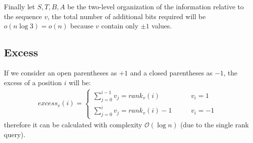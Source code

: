 \documentclass{article}
\begin{document}
Finally let $S,T,B,A$ be the two-level organization of the information relative to the sequence $v$, the total number of additional bits required will be $o(n\log{3})=o(n)$ because $v$ contain only $\pm 1$ values.

\subsection{Excess}
If we consider an open parentheses as $+1$ and a closed parentheses as $-1$, the excess of a position $i$ will be:
     \begin{align*}
        \mathit{excess}_v(i)=
        \begin{cases}
            \sum_{j=0}^{i-1}v_j = \mathit{rank}_v(i) \qquad &v_i=1 \\
            \sum_{j=0}^{i}v_j = \mathit{rank}_v(i)-1 \qquad &v_i=-1
        \end{cases}
    \end{align*}
therefore it can be calculated with complexity $\mathcal{O}(\log{n})$ (due to the single rank query).
\end{document}
